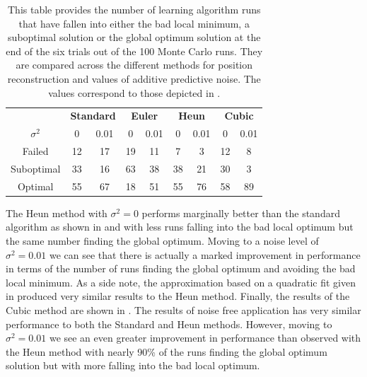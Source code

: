 \begin{table}[]
\renewcommand{\arraystretch}{1.3}
\begin{center}
\small
\begin{tabular}{ c | cc | cc | cc | cc }
\toprule[1.5pt] 
& \multicolumn{2}{c|}{\bf Standard} & \multicolumn{2}{c|}{\bf Euler} & \multicolumn{2}{c|}{\bf Heun} & \multicolumn{2}{c}{\bf Cubic} \\
$\sigma^2$ & 0 & 0.01 & 0 & 0.01 & 0 & 0.01 & 0 & 0.01 \\
\hline
Failed             & 12 & 17     & 19 & 11        & 7 & 3        & 12 & 8 \\
Suboptimal     & 33 & 16     & 63 & 38        & 38 & 21    & 30 & 3 \\
Optimal           & 55 & 67     & 18 & 51        & 55 & 76    & 58 &  89  \\
\bottomrule[1.5pt]
\end{tabular}
\end{center}
\caption{This table provides the number of learning algorithm runs that have fallen into either the bad local minimum, a suboptimal solution or the global optimum solution at the end of the six trials out of the 100 Monte Carlo runs. They are compared across the different methods for position reconstruction and values of additive predictive noise. The values correspond to those depicted in .}
\label{tab:integ}
\end{table}


The Heun method with $\sigma^2=0$ performs marginally better than the standard algorithm as shown in  and  with less runs falling into the bad local optimum but the same number finding the global optimum. Moving to a noise level of $\sigma^2=0.01$ we can see that there is actually a marked improvement in performance in terms of the number of runs finding the global optimum and avoiding the bad local minimum. As a side note, the approximation based on a quadratic fit given in  produced very similar results to the Heun method.
%
Finally, the results of the Cubic method are shown in . The results of noise free application has very similar performance to both the Standard and Heun methods. However, moving to $\sigma^2=0.01$ we see an even greater improvement in performance than observed with the Heun method with nearly 90\% of the runs finding the global optimum solution but with more falling into the bad local optimum.


